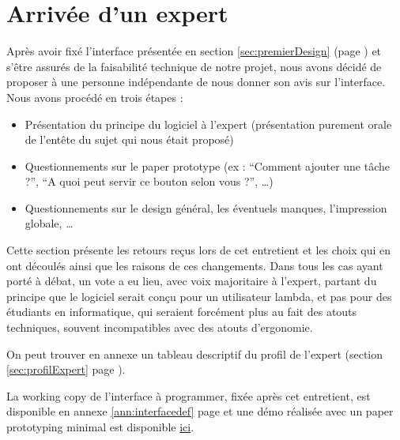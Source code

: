 \documentclass[11pt]{article}
\begin{document}



\section{Arrivée d'un expert}

Après avoir fixé l'interface présentée en section
\ref{sec:premierDesign} (page \pageref{sec:premierDesign}) et s'être
assurés de la faisabilité technique de notre projet, nous avons décidé
de proposer à une personne indépendante de nous donner son avis sur
l'interface. Nous avons procédé en trois étapes :

\begin{itemize}
\item Présentation du principe du logiciel à l'expert (présentation
  purement orale de l'entête du sujet qui nous était proposé)
\item Questionnements sur le paper prototype (ex : ``Comment ajouter
  une tâche ?'', ``A quoi peut servir ce bouton selon vous ?'', \dots)
\item Questionnements sur le design général, les éventuels manques,
  l'impression globale, \dots
\end{itemize}

Cette section présente les retours reçus lors de cet entretient et les
choix qui en ont découlés ainsi que les raisons de ces changements.
Dans tous les cas ayant porté à débat, un vote a eu lieu, avec voix
majoritaire à l'expert, partant du principe que le logiciel serait
conçu pour un utilisateur lambda, et pas pour des étudiants en
informatique, qui seraient forcément plus au fait des atouts
techniques, souvent incompatibles avec des atouts d'ergonomie.

On peut trouver en annexe un tableau descriptif du profil de l'expert
(section \ref{sec:profilExpert} page \pageref{sec:profilExpert}).

La working copy de l'interface à programmer, fixée après cet
entretient, est disponible en annexe \ref{ann:interfacedef} page
\pageref{fig:interfacedefdessin} et une démo réalisée avec un paper
prototyping minimal est disponible
\href{http://daimrod.sbrk.org/demo-taser.MOV}{ici}.
\end{document}
